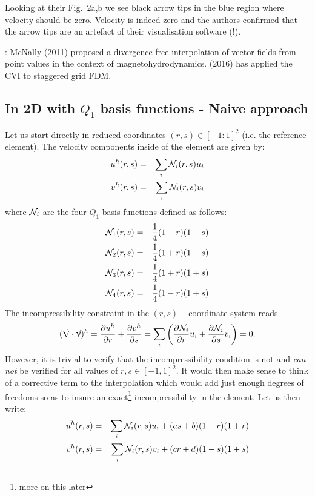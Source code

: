 Looking at their Fig.~2a,b we see black arrow tips in the blue region where 
velocity should be zero. Velocity is indeed zero and the authors confirmed that 
the arrow tips are an artefact of their visualisation software (!).

\Literature: 
McNally (2011) \cite{mcna11} proposed
a divergence-free interpolation of vector fields from point values in the context 
of magnetohydrodynamics. \textcite{pukp16} (2016) has applied the CVI to staggered grid FDM.

 
\subsection{In 2D with $Q_1$ basis functions - Naive approach}

Let us start directly in reduced coordinates $(r,s)\in [-1:1]^2$ (i.e. the reference element).
The velocity components inside of the element are given by:
\begin{eqnarray}
u^h(r,s)&=&\sum_i {\mathcal{N}}_i(r,s) u_i \nonumber\\
v^h(r,s)&=&\sum_i {\mathcal{N}}_i(r,s) v_i \nonumber
\end{eqnarray}
where ${\mathcal{N}}_i$ are the four $Q_1$ basis functions defined as follows:
\begin{eqnarray}
{\mathcal{N}}_1(r,s)&=& \frac{1}{4}(1-r)(1-s)  \nonumber\\ 
{\mathcal{N}}_2(r,s)&=& \frac{1}{4}(1+r)(1-s)  \nonumber\\ 
{\mathcal{N}}_3(r,s)&=& \frac{1}{4}(1+r)(1+s)  \nonumber\\ 
{\mathcal{N}}_4(r,s)&=& \frac{1}{4}(1-r)(1+s)  \nonumber
\end{eqnarray}
The incompressibility constraint in the $(r,s)-$coordinate system reads
\[
(\vec\nabla\cdot\vec\upnu)^h=
\frac{\partial u^h}{\partial r}+
\frac{\partial v^h}{\partial s}
=
\sum_i \left(  
\frac{\partial {\mathcal{N}}_i}{\partial r} u_i+
\frac{\partial {\mathcal{N}}_i}{\partial s} v_i
\right)
=0.
\]
However, it is trivial to verify that the incompressibility 
condition is not and \textit{can not} be verified for all values of  
$r,s \in [-1,1]^2$.
It would then make sense to think of a corrective term to the interpolation
which would add just enough degrees of freedoms so as to insure an exact\footnote{more
on this later} incompressibility in the element. 
Let us then write:
\begin{eqnarray}
u^h(r,s)&=&\sum_i {\mathcal{N}}_i(r,s) u_i + (a s + b)(1-r)(1+r) \nonumber\\
v^h(r,s)&=&\sum_i {\mathcal{N}}_i(r,s) v_i + (c r + d)(1-s)(1+s) \nonumber
\end{eqnarray}
